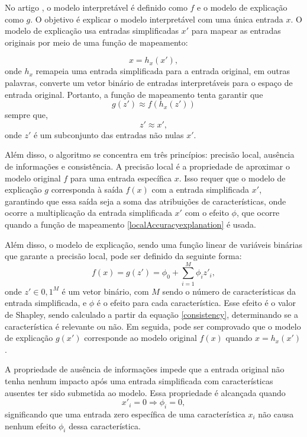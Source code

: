 No artigo \cite{lundberg2017unified}, o modelo interpretável é definido como $f$ e o modelo de explicação como $g$. O objetivo é explicar o modelo interpretável com uma única entrada $x$. O modelo de explicação usa entradas simplificadas $x'$ para mapear as entradas originais por meio de uma função de mapeamento:

\begin{equation}
  \label{localAccuracyexplanation}
  x = h_{x}(x'),
\end{equation}
onde $h_{x}$ remapeia uma entrada simplificada para a entrada original, em outras palavras, converte um vetor binário de entradas interpretáveis para o espaço de entrada original. Portanto, a função de mapeamento tenta garantir que
\[
  g(z') \approx f(h_{x}(z'))
\]
sempre que,
\[
  z' \approx x',
\]
onde $z'$ é um subconjunto das entradas não nulas $x'$.

Além disso, o algoritmo se concentra em três princípios: precisão local, ausência de informações e consistência. A precisão local é a propriedade de aproximar o modelo original $f$ para uma entrada específica $x$. Isso requer que o modelo de explicação $g$ corresponda à saída $f(x)$ com a entrada simplificada $x'$, garantindo que essa saída seja a soma das atribuições de características, onde ocorre a multiplicação da entrada simplificada $x'$ com o efeito $\phi$, que ocorre quando a função de mapeamento \ref{localAccuracyexplanation} é usada.

Além disso, o modelo de explicação, sendo uma função linear de variáveis binárias que garante a precisão local, pode ser definido da seguinte forma:
\begin{equation}
  \label{localAccuracy}
  f(x) = g(z') = \phi_{0} + \sum_{i = 1}^{M} \phi_{i}z'_{i},
\end{equation}
onde $z' \in {0, 1}^{M}$ é um vetor binário, com $M$ sendo o número de características da entrada simplificada, e $\phi$ é o efeito para cada característica. Esse efeito é o valor de Shapley, sendo calculado a partir da equação \ref{consistency}, determinando se a característica é relevante ou não. Em seguida, pode ser comprovado que o modelo de explicação $g(x')$ corresponde ao modelo original $f(x)$ quando $x = h_{x}(x')$.

A propriedade de ausência de informações impede que a entrada original não tenha nenhum impacto após uma entrada simplificada com características ausentes ter sido submetida ao modelo. Essa propriedade é alcançada quando
\begin{equation}
  \label{missingness}
  x'_{i} = 0 \Rightarrow  \phi_{i} = 0,
\end{equation}
significando que uma entrada zero específica de uma característica $x_{i}$ não causa nenhum efeito $\phi_{i}$ dessa característica.

